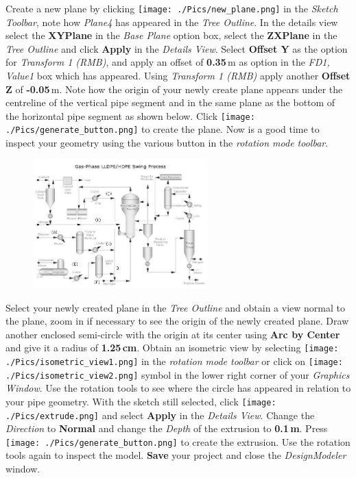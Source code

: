 \documentclass[12pts,a4paper,amsmath,amssymb,floatfix]{article}%
\newcommand\bfr[1]{\textcolor[rgb]{1,0.00,0.00}{\textbf{\textsf{#1}}}}
\begin{document}
\bigskip
Create a new plane by clicking \texttt{[image: ./Pics/new\_plane.png]} in the \emph{Sketch Toolbar}, note how \emph{Plane4} has appeared in the \emph{Tree Outline}. In the details view select the \bfr{XYPlane} in the \emph{Base Plane} option box, select the \bfr{ZXPlane} in the \emph{Tree Outline} and click \bfr{Apply} in the \emph{Details View}. Select \bfr{Offset Y} as the option for \emph{Transform 1 (RMB)}, and apply an offset of \bfr{0.35}\,m as option in the \emph{FD1, Value1} box which has appeared. Using \emph{Transform 1 (RMB)} apply another \bfr{Offset Z} of \bfr{-0.05}\,m. Note how the origin of your newly create plane appears under the centreline of the vertical pipe segment and in the same plane as the bottom of the horizontal pipe segment as shown below. Click \texttt{[image: ./Pics/generate\_button.png]} to create the plane. Now is a good time to inspect your geometry using the various button in the \emph{rotation mode toolbar}.
\begin{figure}[H]
\begin{center}
\includegraphics[width=0.6\textwidth,clip]{./Pics/hdpe_production_img2.jpg}
\end{center}
\end{figure}
Select your newly created plane in the \emph{Tree Outline} and obtain a view normal to the plane, zoom in if necessary to see the origin of the newly created plane. Draw another enclosed semi-circle with the origin at its center using \bfr{Arc by Center} and give it a radius of \bfr{1.25\,cm}. Obtain an isometric view by selecting \texttt{[image: ./Pics/isometric\_view1.png]} in the \emph{rotation mode toolbar} or click on \texttt{[image: ./Pics/isometric\_view2.png]} symbol in the lower right corner of your \emph{Graphics Window}. Use the rotation tools to see where the circle has appeared in relation to your pipe geometry. With the sketch still selected, click \texttt{[image: ./Pics/extrude.png]} and select \bfr{Apply} in the \emph{Details View}. Change the \emph{Direction} to \bfr{Normal} and change the \emph{Depth} of the extrusion to \bfr{0.1\,m}. Press \texttt{[image: ./Pics/generate\_button.png]} to create the extrusion. Use the rotation tools again to inspect the model. \bfr{Save} your project and close the \emph{DesignModeler} window.
\end{document}
